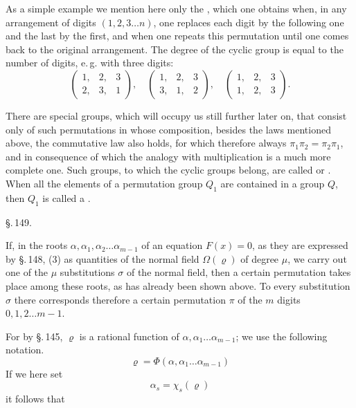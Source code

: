 
As a simple example we mention here only the , which one obtains when, in any
arrangement of digits $(1, 2, 3 \ldots n)$, one replaces each digit by
the following one and the last by the first, and when one repeats this
permutation until one comes back to the original arrangement. The
degree of the cyclic group is equal to the number of digits, e.\,g.
with three digits:
\[
\begin{pmatrix} 1, & 2, & 3 \\ 2, & 3, & 1 \end{pmatrix}, \quad
\begin{pmatrix} 1, & 2, & 3 \\ 3, & 1, & 2 \end{pmatrix}, \quad
\begin{pmatrix} 1, & 2, & 3 \\ 1, & 2, & 3 \end{pmatrix}.
\]

There are special groups, which will occupy us still further later
on, that consist only of such permutations in whose composition,
besides the laws mentioned above, the commutative law also holds, for
which therefore always $\pi_1 \pi_2 = \pi_2 \pi_1$, and in consequence
of which the analogy with multiplication is a much more complete one.
Such groups, to which the cyclic groups belong, are called
 or . When all the
elements of a permutation group $Q_1$ are contained in a group $Q$,
then $Q_1$ is called a .

\begin{center}
\S.\,149.

\end{center}

If, in the roots $\alpha, \alpha_1, \alpha_2 \ldots \alpha_{m-1}$ of
an equation $F(x) = 0$, as they are expressed by \S.\,148, (3) as
quantities of the normal field $\Omega(\varrho)$ of degree $\mu$, we
carry out one of the $\mu$ substitutions $\sigma$ of the normal field,
then a certain permutation takes place among these roots, as has
already been shown above. To every substitution $\sigma$ there
corresponds therefore a certain permutation $\pi$ of the $m$ digits
$0, 1, 2 \ldots m-1$. 

For by \S.\,145, $\varrho$ is a rational function of $\alpha,
\alpha_1 \ldots \alpha_{m-1}$; we use the following notation.
\[
\varrho = \Phi(\alpha, \alpha_1 \ldots \alpha_{m-1})
\]
If we here set
\[
\alpha_s = \chi_s(\varrho)
\]
it follows that

